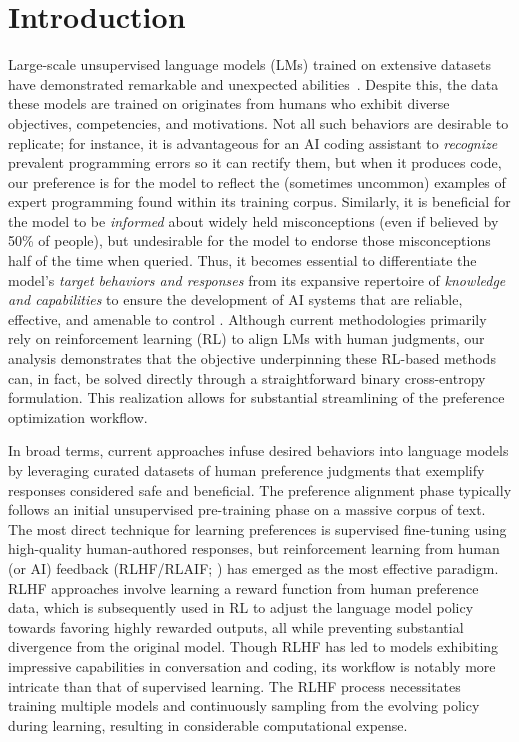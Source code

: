 \section{Introduction}
Large-scale unsupervised language models (LMs) trained on extensive datasets have demonstrated remarkable and unexpected abilities~\citep{chowdhery2022palm, brown2020language, touvron2023llama,bubeck2023sparks}. Despite this, the data these models are trained on originates from humans who exhibit diverse objectives, competencies, and motivations. Not all such behaviors are desirable to replicate; for instance, it is advantageous for an AI coding assistant to \textit{recognize} prevalent programming errors so it can rectify them, but when it produces code, our preference is for the model to reflect the (sometimes uncommon) examples of expert programming found within its training corpus. Similarly, it is beneficial for the model to be \textit{informed} about widely held misconceptions (even if believed by 50\% of people), but undesirable for the model to endorse those misconceptions half of the time when queried. Thus, it becomes essential to differentiate the model's \emph{target behaviors and responses} from its expansive repertoire of \textit{knowledge and capabilities} to ensure the development of AI systems that are reliable, effective, and amenable to control \citep{ouyang2022training}. Although current methodologies primarily rely on reinforcement learning (RL) to align LMs with human judgments, our analysis demonstrates that the objective underpinning these RL-based methods can, in fact, be solved directly through a straightforward binary cross-entropy formulation. This realization allows for substantial streamlining of the preference optimization workflow.

In broad terms, current approaches infuse desired behaviors into language models by leveraging curated datasets of human preference judgments that exemplify responses considered safe and beneficial. The preference alignment phase typically follows an initial unsupervised pre-training phase on a massive corpus of text. The most direct technique for learning preferences is supervised fine-tuning using high-quality human-authored responses, but reinforcement learning from human (or AI) feedback (RLHF/RLAIF; \citep{christiano2017deep,bai2022constitutional}) has emerged as the most effective paradigm. RLHF approaches involve learning a reward function from human preference data, which is subsequently used in RL to adjust the language model policy towards favoring highly rewarded outputs, all while preventing substantial divergence from the original model. Though RLHF has led to models exhibiting impressive capabilities in conversation and coding, its workflow is notably more intricate than that of supervised learning. The RLHF process necessitates training multiple models and continuously sampling from the evolving policy during learning, resulting in considerable computational expense.

